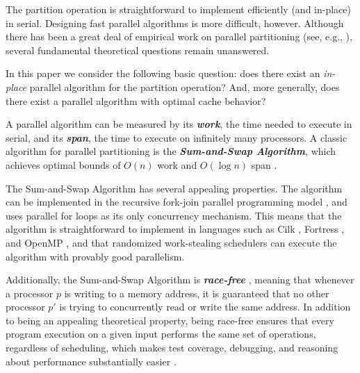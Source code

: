 \documentclass[11pt]{article}
\newcommand{\defn}[1]{{\textit{\textbf{\boldmath #1}}}}
\renewcommand{\paragraph}[1]{\vspace{0.09in}\noindent{\bf \boldmath #1.}}
\theoremstyle{remark}
\theoremstyle{remark}
\begin{document}
The partition operation is straightforward to implement efficiently
(and in-place) in serial. Designing fast parallel algorithms is more
difficult, however. Although there has been a great deal of empirical
work on parallel partitioning (see, e.g., \cite{HeidelbergerNo90,
  AxtmannWi17, TsigasZh03, FrancisPa92, Frias08}), several fundamental
theoretical questions remain unanswered.

In this paper we consider the following basic question: does there
exist an \emph{in-place} parallel algorithm for the partition
operation? And, more generally, does there exist a parallel algorithm
with optimal cache behavior?

\paragraph{The Classic Sum-and-Swap Algorithm}
A parallel algorithm can be measured by its \defn{work}, the time
needed to execute in serial, and its \defn{span}, the time to execute
on infinitely many processors. A classic algorithm for parallel
partitioning is the \defn{Sum-and-Swap Algorithm}, which achieves
optimal bounds of $O(n)$ work and $O(\log n)$ span
\cite{Blelloch96,AcarBl16}. 

The Sum-and-Swap Algorithm has several appealing properties. The
algorithm can be implemented in the recursive fork-join parallel
programming model \cite{BlumofeLe99, FrigoLeRa98, AroraBlPl98,
  BlumofeJo96, CLRS, FengLe99, Cilkmem, ForkJoin1, Forkjoin2}, and uses
parallel for loops as its only concurrency mechanism. This means that
the algorithm is straightforward to implement in languages such as
Cilk \cite{FrigoLeRa98, Leiserson10, IntelCilkPlus10}, Fortress
\cite{AllenChHa+08}, and OpenMP \cite{OpenMP08, AyguadeCoDu09}, and
that randomized work-stealing schedulers \cite{BlumofeLe99,
  FrigoLeRa98, AroraBlPl98, BlumofeJo96} can execute the algorithm
with provably good parallelism.

Additionally, the Sum-and-Swap Algorithm is \defn{race-free}
\cite{FengLe99, NetzerMi92}, meaning that whenever a processor $p$ is
writing to a memory address, it is guaranteed that no other processor
$p'$ is trying to concurrently read or write the same address. In
addition to being an appealing theoretical property, being race-free
ensures that every program execution on a given input performs the
same set of operations, regardless of scheduling, which makes test
coverage, debugging, and reasoning about performance substantially
easier \cite{BlellochFi12}.
\end{document}
